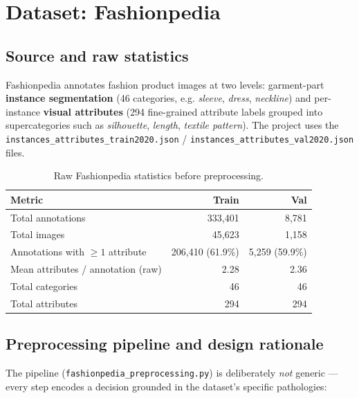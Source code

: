 \documentclass[11pt]{article}
\newcommand{\code}[1]{\texttt{\small #1}}
\begin{document}
\section{Dataset: Fashionpedia}

\subsection{Source and raw statistics}

Fashionpedia annotates fashion product images at two levels: garment-part \textbf{instance segmentation} (46 categories, e.g. \emph{sleeve}, \emph{dress}, \emph{neckline}) and per-instance \textbf{visual attributes} (294 fine-grained attribute labels grouped into supercategories such as \emph{silhouette}, \emph{length}, \emph{textile pattern}). The project uses the \code{instances\_attributes\_train2020.json} / \code{instances\_attributes\_val2020.json} files.

\begin{table}[h]
\centering
\begin{tabular}{lrr}
\toprule
\textbf{Metric} & \textbf{Train} & \textbf{Val} \\
\midrule
Total annotations & 333{,}401 & 8{,}781 \\
Total images & 45{,}623 & 1{,}158 \\
Annotations with $\geq 1$ attribute & 206{,}410 (61.9\%) & 5{,}259 (59.9\%) \\
Mean attributes / annotation (raw) & 2.28 & 2.36 \\
Total categories & 46 & 46 \\
Total attributes & 294 & 294 \\
\bottomrule
\end{tabular}
\caption{Raw Fashionpedia statistics before preprocessing.}
\end{table}

\subsection{Preprocessing pipeline and design rationale}

The pipeline (\code{fashionpedia\_preprocessing.py}) is deliberately \emph{not} generic --- every step encodes a decision grounded in the dataset's specific pathologies:
\end{document}
